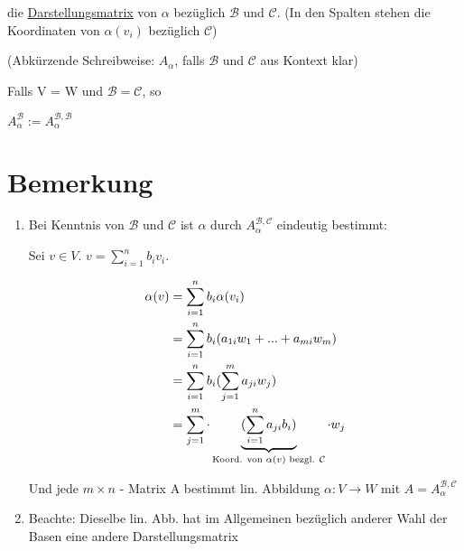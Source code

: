 \documentclass[a4paper, openany]{book}
\begin{document}
        die \underline{Darstellungsmatrix} von $\alpha$ bezüglich $\mathcal{B}$ und $\mathcal{C}$. (In den Spalten stehen die Koordinaten von $\alpha(v_i)$ bezüglich $\mathcal{C}$)

        (Abkürzende Schreibweise: $A_{\alpha}$, falls $\mathcal{B}$ und $\mathcal{C}$ aus Kontext klar)

        \par \medskip

        \par \medskip

        Falls V = W und $\mathcal{B} = \mathcal{C}$, so

        \begin{center}
          $A_{\alpha}^{\mathcal{B}} := A_{\alpha}^{\mathcal{B}, \mathcal{B}}$
        \end{center}

        \section{Bemerkung}

        \begin{enumerate}[label=(\alph*)]
          \item Bei Kenntnis von $\mathcal{B}$ und $\mathcal{C}$ ist $\alpha$ durch $A_{\alpha}^{\mathcal{B,C}}$ eindeutig bestimmt:

          Sei $v \in V$. $v = \sum_{i=1}^n b_i v_i$.

          \begin{align*}
            \alpha(v) & = \sum_{i=1}^n b_i \alpha(v_i) \\
                      & = \sum_{i=1}^n b_i (a_{1i} w_1 + ... + a_{mi} w_m) \\
                      & = \sum_{i=1}^n b_i (\sum_{j=1}^m a_{ji} w_j) \\
                      & = \sum_{j=1}^m \cdot \underbrace{(\sum_{i=1}^n a_{ji} b_i)}_{\textnormal{Koord. von $\alpha(v)$ bezgl. $\mathcal{C}$}} \cdot  w_j
          \end{align*}

          Und jede $m \times n$ - Matrix A bestimmt lin. Abbildung $\alpha : V \rightarrow W$ mit $A = A_{\alpha}^{\mathcal{B, C}}$

          \item Beachte: Dieselbe lin. Abb. hat im Allgemeinen bezüglich anderer Wahl der Basen eine andere Darstellungsmatrix
        \end{enumerate}
\end{document}
